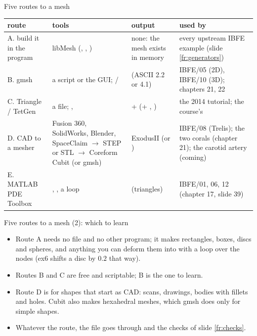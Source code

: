 \documentclass[aspectratio=169,11pt]{beamer}
\begin{document}
\begin{frame}{Five routes to a mesh}
\label{fr:routes}
\scriptsize
\begin{tabular}{@{}L{0.18\textwidth}L{0.30\textwidth}L{0.22\textwidth}L{0.20\textwidth}@{}}
\toprule
route & tools & output & used by \\
\midrule
A. build it in the program & libMesh  (, , ) & none: the mesh exists in memory & every upstream IBFE example (slide \ref{fr:generators}) \\
B. gmsh & a  script or the GUI; / &  (ASCII 2.2 or 4.1) & IBFE/05 (2D), IBFE/10 (3D); chapters 21, 22 \\
C. Triangle / TetGen & a  file; ,  &  +  (+ , ) & the 2014 tutorial; the course's  \\
D. CAD to a mesher & Fusion 360, SolidWorks, Blender, SpaceClaim $\to$ STEP or STL $\to$ Coreform Cubit (or gmsh) &  ExodusII (or ) & IBFE/08 (Trelis); the two corals (chapter 21); the carotid artery (coming) \\
E. MATLAB PDE Toolbox & , , a  loop &  (triangles) & IBFE/01, 06, 12 (chapter 17, slide 39) \\
\bottomrule
\end{tabular}

\end{frame}

\begin{frame}{Five routes to a mesh (2): which to learn}
\label{fr:routes2}
\footnotesize
\begin{itemize}
  \item Route A needs no file and no other program; it makes rectangles, boxes, discs and spheres, and anything you can deform them into with a loop over the nodes (ex6 shifts a disc by $0.2$ that way).
  \item Routes B and C are free and scriptable; B is the one to learn.
  \item Route D is for shapes that start as CAD: scans, drawings, bodies with fillets and holes. Cubit also makes hexahedral meshes, which gmsh does only for simple shapes.
  \item Whatever the route, the file goes through  and the checks of slide \ref{fr:checks}.
\end{itemize}
\end{frame}
\end{document}
